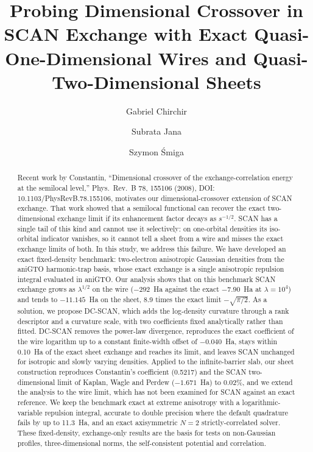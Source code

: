 \documentclass[journal=jctcce,manuscript=article]{achemso}
\title{Probing Dimensional Crossover in SCAN Exchange with Exact Quasi-One-Dimensional Wires and Quasi-Two-Dimensional Sheets}
\author{Gabriel Chirchir}
\author{Subrata Jana}
\author{Szymon \'Smiga}
\affiliation{Institute of Physics, Faculty of Physics, Astronomy and Informatics,
Nicolaus Copernicus University in Toru\'n, ul.~Grudzi\c{a}dzka~5, 87-100 Toru\'n, Poland}
\newcommand{\novelty}[1]{{\color{red}#1}}
\begin{document}
\begin{abstract}
Recent work by Constantin, ``Dimensional crossover of the exchange-correlation
energy at the semilocal level,'' \novelty{Phys.\ Rev.\ B 78, 155106 (2008), DOI:
10.1103/PhysRevB.78.155106}, motivates our dimensional-crossover extension of SCAN
exchange.  That work showed that a semilocal functional can recover the exact
two-dimensional exchange limit if its enhancement factor decays as $s^{-1/2}$.
SCAN has a single tail of this kind and cannot use it selectively: on one-orbital
densities its iso-orbital indicator vanishes, so it cannot tell a sheet from a
wire and misses the exact exchange limits of both.  In this study, we address this
failure.  We have developed an exact fixed-density benchmark: two-electron
anisotropic Gaussian densities from the aniGTO harmonic-trap basis, whose exact
exchange is a single anisotropic repulsion integral evaluated in aniGTO.  Our
analysis shows that on this benchmark SCAN exchange grows as $\lambda^{1/2}$ on the
wire ($-292$~Ha against the exact $-7.90$~Ha at $\lambda=10^4$) and tends to
$-11.145$~Ha on the sheet, 8.9 times the exact limit $-\sqrt{\pi/2}$.  As a
solution, we propose DC-SCAN, which adds the log-density curvature through a rank
descriptor and a curvature scale, with two coefficients fixed analytically rather
than fitted.  DC-SCAN removes the power-law divergence, reproduces the exact
coefficient of the wire logarithm up to a constant finite-width offset of
$-0.040$~Ha, stays within 0.10~Ha of the exact sheet exchange and reaches its
limit, and leaves SCAN unchanged for isotropic and slowly varying densities.
\novelty{Applied to the infinite-barrier slab, our sheet construction reproduces
Constantin's coefficient (0.5217) and the SCAN two-dimensional limit of Kaplan,
Wagle and Perdew ($-1.671$~Ha) to 0.02\%, and we extend the analysis to the wire
limit, which has not been examined for SCAN against an exact reference.}  We keep
the benchmark exact at extreme anisotropy with a logarithmic-variable repulsion
integral, accurate to double precision where the default quadrature fails by up to
11.3~Ha, and an exact axisymmetric $N=2$ strictly-correlated solver.  These
fixed-density, exchange-only results are the basis for tests on non-Gaussian
profiles, three-dimensional norms, the self-consistent potential and correlation.
\end{abstract}
\end{document}
